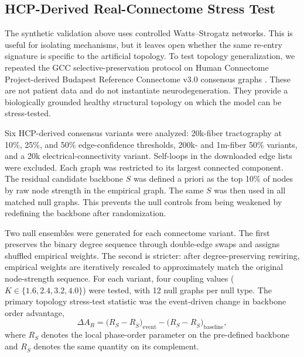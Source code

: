\documentclass[11pt,a4paper]{article}
\theoremstyle{plain}
\theoremstyle{definition}
\theoremstyle{remark}
\begin{document}
\subsection{HCP-Derived Real-Connectome Stress Test}
\label{sec:hcp-connectome}

The synthetic validation above uses controlled Watts--Strogatz networks. This is useful for isolating mechanisms, but it leaves open whether the same re-entry signature is specific to the artificial topology. To test topology generalization, we repeated the GCC selective-preservation protocol on Human Connectome Project-derived Budapest Reference Connectome v3.0 consensus graphs \citep{szalkai2015,szalkai2017}. These are not patient data and do not instantiate neurodegeneration. They provide a biologically grounded healthy structural topology on which the model can be stress-tested.

Six HCP-derived consensus variants were analyzed: 20k-fiber tractography at 10\%, 25\%, and 50\% edge-confidence thresholds, 200k- and 1m-fiber 50\% variants, and a 20k electrical-connectivity variant. Self-loops in the downloaded edge lists were excluded. Each graph was restricted to its largest connected component. The residual candidate backbone $S$ was defined a priori as the top 10\% of nodes by raw node strength in the empirical graph. The same $S$ was then used in all matched null graphs. This prevents the null controls from being weakened by redefining the backbone after randomization.

Two null ensembles were generated for each connectome variant. The first preserves the binary degree sequence through double-edge swaps and assigns shuffled empirical weights. The second is stricter: after degree-preserving rewiring, empirical weights are iteratively rescaled to approximately match the original node-strength sequence. For each variant, four coupling values ($K \in \{1.6,2.4,3.2,4.0\}$) were tested, with 12 null graphs per null type. The primary topology stress-test statistic was the event-driven change in backbone order advantage,
\begin{equation}
\Delta A_R = \bigl(R_S - R_{\bar S}\bigr)_{\mathrm{event}} - \bigl(R_S - R_{\bar S}\bigr)_{\mathrm{baseline}},
\end{equation}
where $R_S$ denotes the local phase-order parameter on the pre-defined backbone and $R_{\bar S}$ denotes the same quantity on its complement.
\end{document}
